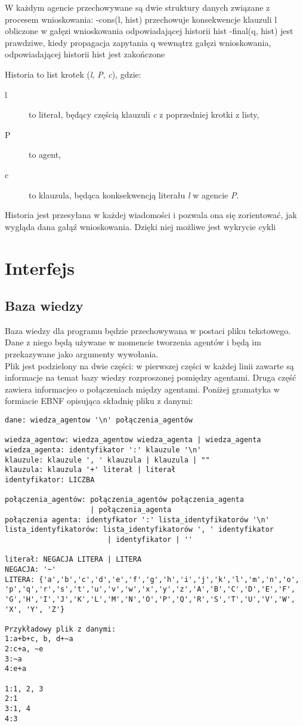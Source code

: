 \documentclass[a4paper,12pt]{mwart}
\begin{document}
W każdym agencie przechowywane są dwie struktury danych związane z procesem wnioskowania:
-cons(l, hist) przechowuje konsekwencje klauzuli l obliczone w gałęzi wnioskowania odpowiadającej historii hist
-final(q, hist) jest prawdziwe, kiedy propagacja zapytania q wewnątrz gałęzi wnioskowania, odpowiadającej historii hist jest zakończone

Historia to list krotek (\textit{l}, \textit{P}, \textit{c}), gdzie:
\begin{description}
\item[l] to literał, będący częścią klauzuli \textit{c} z poprzedniej krotki z listy,
\item[P] to agent,
\item[c] to klauzula, będąca konksekwencją literału \textit{l} w agencie \textit{P}.
\end{description}
Historia jest przesyłana w każdej wiadomości i pozwala ona się zorientować, jak wygląda dana gałąź wnioskowania. Dzięki niej możliwe jest wykrycie cykli

\section{Interfejs}
\subsection{Baza wiedzy}
Baza wiedzy dla programu będzie przechowywana w postaci pliku tekstowego. Dane z niego będą używane w momencie tworzenia agentów i będą im przekazywane jako argumenty wywołania.
\\
Plik jest podzielony na dwie części: w pierwszej części w każdej linii zawarte są informacje na temat bazy wiedzy rozproszonej pomiędzy agentami. Druga część zawiera informacjeo o połączeniach między agentami. Poniżej gramatyka w formiacie EBNF opisująca składnię pliku z danymi:

\begin{verbatim}
dane: wiedza_agentow '\n' połączenia_agentów

wiedza_agentow: wiedza_agentow wiedza_agenta | wiedza_agenta
wiedza_agenta: identyfikator ':' klauzule '\n'
klauzule: klauzule ', ' klauzula | klauzula | ""
klauzula: klauzula '+' literał | literał
identyfikator: LICZBA

połączenia_agentów: połączenia_agentów połączenia_agenta 
					| połączenia_agenta
połączenia agenta: identyfkator ':' lista_identyfikatorów '\n'
lista_identyfikatorów: lista_identyfikatorów ', ' identyfikator 
						| identyfikator | ''

literał: NEGACJA LITERA | LITERA
NEGACJA: '~' 
LITERA: {'a','b','c','d','e','f','g','h','i','j','k','l','m','n','o',
'p','q','r','s','t','u','v','w','x','y','z','A','B','C','D','E','F',
'G','H','I','J','K','L','M','N','O','P','Q','R','S','T','U','V','W',
'X', 'Y', 'Z'}

Przykładowy plik z danymi:
1:a+b+c, b, d+~a
2:c+a, ~e
3:~a
4:e+a

1:1, 2, 3
2:1
3:1, 4
4:3
\end{verbatim}
\end{document}
